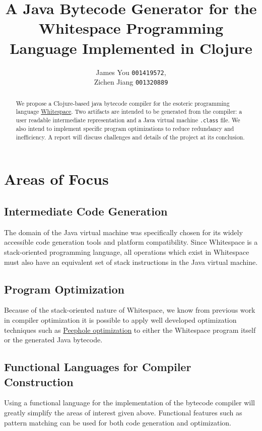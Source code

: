 \documentclass[10pt,letter]{article}
\title{A Java Bytecode Generator for the Whitespace Programming Language Implemented in Clojure}
\author{James You \texttt{001419572},
	\\ Zichen Jiang \texttt{001320889}}
\begin{document}
	
	\maketitle
	\begin{abstract}
		We propose a Clojure-based java bytecode compiler for the esoteric programming language \href{https://web.archive.org/web/20151101230744/http://compsoc.dur.ac.uk/whitespace/tutorial.html}{Whitespace}. Two artifacts are intended to be generated from the compiler: a user readable intermediate representation and a Java virtual machine \texttt{.class} file. We also intend to implement specific program optimizations to reduce redundancy and inefficiency. A report will discuss challenges and details of the project at its conclusion.
	\end{abstract}

	\section{Areas of Focus}
	
		\subsection{Intermediate Code Generation}
			The domain of the Java virtual machine was specifically chosen for its widely accessible code generation tools and platform compatibility. Since Whitespace is a stack-oriented programming language, all operations which exist in Whitespace must also have an equivalent set of stack instructions in the Java virtual machine.
		\subsection{Program Optimization}
			Because of the stack-oriented nature of Whitespace, we know from previous work in compiler optimization it is possible to apply well developed optimization techniques such as \href{https://dl.acm.org/citation.cfm?id=365000}{Peephole optimization} to either the Whitespace program itself or the generated Java bytecode.
		\subsection{Functional Languages for Compiler Construction}
			Using a functional language for the implementation of the bytecode compiler will greatly simplify the areas of interest given above. Functional features such as pattern matching can be used for both code generation and optimization.
	
\end{document}
